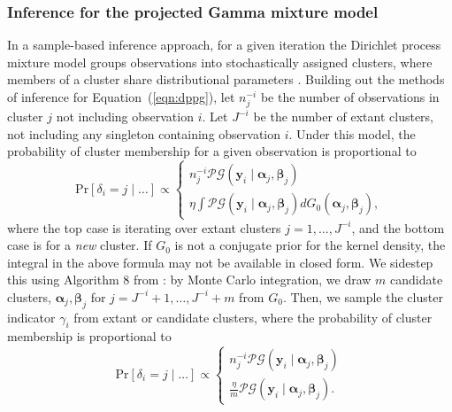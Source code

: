 \subsubsection{Inference for the projected Gamma mixture model}
In a sample-based inference approach, for a given iteration the Dirichlet process mixture model 
    groups observations into stochastically assigned clusters, where members of a cluster share 
    distributional parameters \citep{muller2015,ascolani2022}. Building out the methods of inference for Equation~(\ref{eqn:dppg}), 
    let $n_j^{-i}$ be the number of observations in cluster $j$ not including observation $i$.  Let $J^{-i}$ be 
    the number of extant clusters, not including any singleton containing observation $i$. Under this model, 
    the probability of cluster membership for a given observation is proportional to
\begin{equation*}
    \text{Pr}\left[\delta_i = j\mid\ldots\right] \propto \begin{cases}
        n_j^{-i}\mathcal{PG}\left(\bm{y}_i\mid\bm{\alpha}_j,\bm{\beta}_j\right)\\ %
        \eta\int\mathcal{PG}\left(\bm{y}_i\mid\bm{\alpha}_j,\bm{\beta}_j\right)dG_0(\bm{\alpha}_j,\bm{\beta}_j),%
        \end{cases}
\end{equation*}
where the top case is iterating over extant clusters $j = 1,\ldots, J^{-i}$, and the bottom case is
    for a \emph{new} cluster. If $G_0$ is not a conjugate prior for the kernel density, the integral in the 
    above formula may not be available in closed form. We sidestep this using Algorithm 8 from \cite{neal2000}: 
    by Monte Carlo integration, we draw $m$ candidate clusters, $\bm{\alpha}_j,\bm{\beta}_j$ for
    $j = J^{-i} + 1,\ldots, J^{-i} + m$ from $G_0$. Then, we sample the cluster indicator 
    $\gamma_i$ from extant or candidate clusters, where the probability of cluster membership is proportional to
\begin{equation}
    \text{Pr}\left[\delta_i = j\mid\ldots\right] \propto \begin{cases}
        n_j^{-i}\mathcal{PG}\left(\bm{y}_i\mid\bm{\alpha}_j,\bm{\beta}_j\right)\\ %
        \frac{\eta}{m}\mathcal{PG}\left(\bm{y}_i\mid\bm{\alpha}_j,\bm{\beta}_j\right). %
        \end{cases}
\end{equation}
